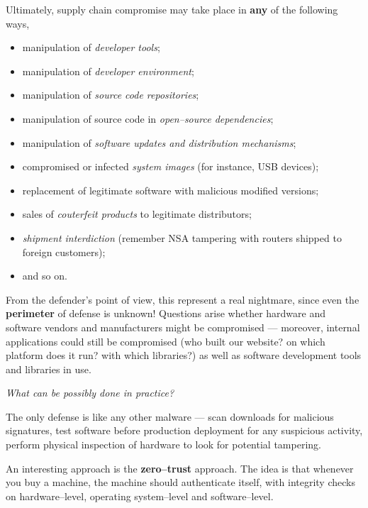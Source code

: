 \documentclass[10pt]{\classname}
\begin{document}
Ultimately, supply chain compromise may take place in \textbf{any} of the
following ways,
\begin{itemize}
    \item manipulation of \emph{developer tools};
    \item manipulation of \emph{developer environment};
    \item manipulation of \emph{source code repositories};
    \item manipulation of source code in \emph{open--source dependencies};
    \item manipulation of \emph{software updates and distribution mechanisms};
    \item compromised or infected \emph{system images} (for instance, USB
        devices);
    \item replacement of legitimate software with malicious modified versions;
    \item sales of \emph{couterfeit products} to legitimate distributors;
    \item \emph{shipment interdiction} (remember NSA tampering with routers
        shipped to foreign customers);
    \item and so on.
\end{itemize}

From the defender's point of view, this represent a real nightmare, since even
the \textbf{perimeter} of defense is unknown! Questions arise whether hardware
and software vendors and manufacturers might be compromised --- moreover,
internal applications could still be compromised (who built our
website? on which platform does it run? with which libraries?) as well as
software development tools and libraries in use.

\vspace*{1cm}

\begin{center}
\emph{What can be possibly done in practice?}
\end{center}

\vspace*{1cm}

The only defense is like any other malware --- scan downloads for malicious
signatures, test software before production deployment for any suspicious
activity, perform physical inspection of hardware to look for potential
tampering.

An interesting approach is the \textbf{zero--trust} approach. The idea is that
whenever you buy a machine, the machine should authenticate itself, with
integrity checks on hardware--level, operating system--level and
software--level.
\end{document}
